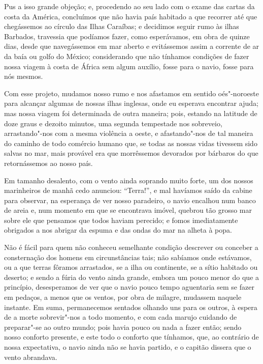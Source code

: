 Pus a isso grande objeção; e, procedendo ao seu lado com o exame das
cartas da costa da América, concluímos que não havia país habitado a que
recorrer até que chegássemos ao círculo das Ilhas Caraíbas; e decidimos
seguir rumo às ilhas Barbados, travessia que podíamos fazer, como
esperávamos, em obra de quinze dias, desde que navegássemos em mar
aberto e evitássemos assim a corrente de ar da baía ou golfo do México;
considerando que não tínhamos condições de fazer nossa viagem à costa de
África sem algum auxílio, fosse para o navio, fosse para nós mesmos.

Com esse projeto, mudamos nosso rumo e nos afastamos em sentido
oés"-noroeste para alcançar algumas de nossas ilhas inglesas, onde eu
esperava encontrar ajuda; mas nossa viagem foi determinada de outra
maneira; pois, estando na latitude de doze graus e dezoito minutos, uma
segunda tempestade nos sobreveio, arrastando"-nos com a mesma violência a
oeste, e afastando"-nos de tal maneira do caminho de todo comércio humano
que, se todas as nossas vidas tivessem sido salvas no mar, mais provável
era que morrêssemos devorados por bárbaros do que retornássemos ao nosso
país.

Em tamanho desalento, com o vento ainda soprando muito forte, um dos
nossos marinheiros de manhã cedo anunciou: ``Terra!'', e mal havíamos
saído da cabine para observar, na esperança de ver nosso paradeiro, o
navio encalhou num banco de areia e, num momento em que se encontrava
imóvel, quebrou tão grosso mar sobre ele que pensamos que todos haviam
perecido; e fomos imediatamente obrigados a nos abrigar da espuma e das
ondas do mar na alheta à popa.

Não é fácil para quem não conheceu semelhante condição descrever ou
conceber a consternação dos homens em circunstâncias tais; não sabíamos
onde estávamos, ou a que terras fôramos arrastados, se a ilha ou
continente, se a sítio habitado ou deserto; e sendo a fúria do vento
ainda grande, embora um pouco menor do que a princípio, desesperamos de
ver que o navio pouco tempo aguentaria sem se fazer em pedaços, a menos
que os ventos, por obra de milagre, mudassem naquele instante. Em suma,
permanecemos sentados olhando uns para os outros, à espera de a morte
sobrevir"-nos a todo momento, e com cada marujo cuidando de preparar"-se
ao outro mundo; pois havia pouco ou nada a fazer então; sendo nosso
conforto presente, e este todo o conforto que tínhamos, que, ao
contrário de nossa expectativa, o navio ainda não se havia partido, e o
capitão dissera que o vento abrandava.

